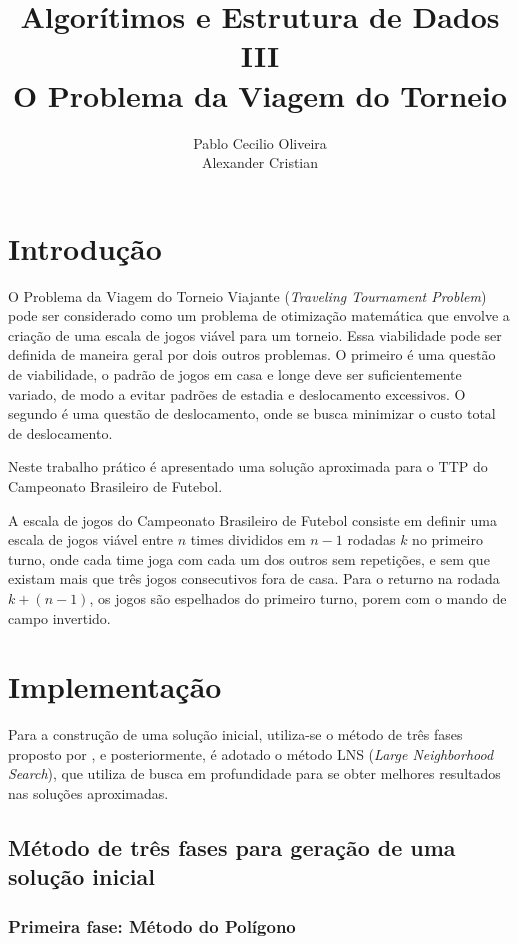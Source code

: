 \documentclass[12pt,a4paper]{article}
\author{Pablo Cecilio Oliveira\\
	Alexander Cristian}
\title{Algorítimos e Estrutura de Dados III\\
O Problema da Viagem do Torneio}
\date{}
\numberwithin{figure}{section}
\numberwithin{table}{section}
\begin{document}
\maketitle

\section{Introdução}

O Problema da Viagem do Torneio Viajante (\textit{Traveling Tournament Problem}) pode ser considerado como um problema de otimização matemática que envolve a criação de uma escala de jogos viável para um torneio. Essa viabilidade pode ser definida de maneira geral por dois outros problemas. O primeiro é uma questão de viabilidade, o padrão de jogos em casa e longe deve ser suficientemente variado, de modo a evitar padrões de estadia e deslocamento excessivos. O segundo é uma questão de deslocamento, onde se busca minimizar o custo total de deslocamento.

Neste trabalho prático é apresentado uma solução aproximada para o TTP do Campeonato Brasileiro de Futebol.

A escala de jogos do Campeonato Brasileiro de Futebol consiste em definir uma escala de jogos viável entre $n$ times divididos em $n-1$ rodadas $k$ no primeiro turno, onde cada time joga com cada um dos outros sem repetições, e sem que existam mais que três jogos consecutivos fora de casa. Para o returno na rodada $k + (n - 1)$, os jogos são espelhados do primeiro turno, porem com o mando de campo invertido.

\section{Implementação}

Para a construção de uma solução inicial, utiliza-se o método de três fases proposto por \citeauthor{urrutia:heuristics}, e posteriormente, é adotado o método LNS (\textit{Large Neighborhood Search}), que utiliza de busca em profundidade para se obter melhores resultados nas soluções aproximadas.

\subsection{Método de três fases para geração de uma solução inicial}

\subsubsection{Primeira fase: Método do Polígono}
\label{subsec:primeirafase}
\end{document}
